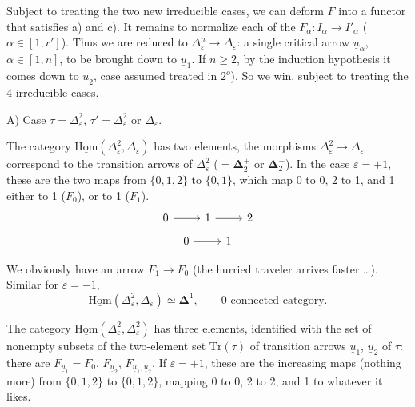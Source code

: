 \documentclass[11pt]{article}
\newcommand{\msp}[1]{\marginpar{\footnotesize [#1]}}
\newcommand{\uHom}{\underline{\mathrm{Hom}}}
\newcommand{\ul}[1]{\underline{#1}}
\begin{document}
Subject to treating the two new irreducible cases, we can deform $F$ into a functor that satisfies a) and c). It remains to normalize each of the $F_\alpha:I_\alpha\longrightarrow I'_\alpha$ ($\alpha\in[1,r']$). Thus we are reduced to $\Delta^n_\varepsilon\longrightarrow\Delta_\varepsilon$: a single critical arrow $\ul{u}_\alpha$, $\alpha\in[1,n]$, to be brought down to $\ul{u}_1$. If $n\geq2$, by the induction hypothesis it comes down to $\ul{u}_2$, case assumed treated in $2^o$). So
\msp{page 92}
we win, subject to treating the 4 irreducible cases.

A) Case $\tau=\Delta^2_\varepsilon$, $\tau'=\Delta^2_\varepsilon$ or $\Delta_\varepsilon$.

The category $\uHom(\Delta^2_\varepsilon,\Delta_\varepsilon)$ has two elements, the morphisms $\Delta^2_\varepsilon\longrightarrow\Delta_\varepsilon$ correspond to the transition arrows of $\Delta^2_\varepsilon$ ($=\mathbf{\Delta}^+_2$ or $\mathbf{\Delta}^-_2$). In the case $\varepsilon=+1$, these are the two maps from $\{0,1,2\}$ to $\{0,1\}$, which map 0 to 0, 2 to 1, and 1 either to 1 ($F_0$), or to 1 ($F_1$).
\[
\begin{tikzcd}
0 \arrow[r] & 1 \arrow[r] & 2
\end{tikzcd}
\]
\[
\begin{tikzcd}
0 \arrow[r] & 1
\end{tikzcd}
\]

We obviously have an arrow $F_1\longrightarrow F_0$ (the hurried traveler arrives faster \ldots). Similar for $\varepsilon=-1$,
\[
\uHom(\Delta^2_\varepsilon,\Delta_\varepsilon)\simeq\mathbf{\Delta}^1,\qquad\text{0-connected category.}
\]

The category $\uHom(\Delta^2_\varepsilon,\Delta^2_\varepsilon)$ has three elements, identified with the set of nonempty subsets of the two-element set $\mathrm{Tr}(\tau)$ of transition arrows $\ul{u}_1$, $\ul{u}_2$ of $\tau$: there are $F_{\ul{u}_1}=F_0$, $F_{\ul{u}_2}$, $F_{\ul{u}_1,\ul{u}_2}$. If $\varepsilon=+1$, these are the increasing maps (nothing more) from $\{0,1,2\}$ to $\{0,1,2\}$, mapping 0 to 0, 2 to 2, and 1 to whatever it likes. %
\end{document}
